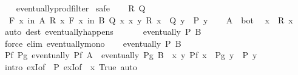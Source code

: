 \begin{isabellebody}
%
\isadelimproof
\ \ %
\endisadelimproof
%
\isatagproof
{}\isamarkupfalse%
\ eventually{\isacharunderscore}{\kern0pt}prod{\isacharunderscore}{\kern0pt}filter\isanewline
{}\isamarkupfalse%
\ safe\isanewline
\ \ \isamarkupfalse%
\ R\ Q\isanewline
\ \ \isamarkupfalse%
\ {\isacharasterisk}{\kern0pt}{\isacharcolon}{\kern0pt}\ {\isachardoublequoteopen}{\isasymforall}\isactrlsub F\ x\ in\ A{\isachardot}{\kern0pt}\ R\ x{\isachardoublequoteclose}\ {\isachardoublequoteopen}{\isasymforall}\isactrlsub F\ x\ in\ B{\isachardot}{\kern0pt}\ Q\ x{\isachardoublequoteclose}\ {\isachardoublequoteopen}{\isasymforall}x\ y{\isachardot}{\kern0pt}\ R\ x\ {\isasymlongrightarrow}\ Q\ y\ {\isasymlongrightarrow}\ P\ y{\isachardoublequoteclose}\isanewline
\ \ \isamarkupfalse%
\ {\isacartoucheopen}A\ {\isasymnoteq}\ bot{\isacartoucheclose}\ \isamarkupfalse%
\ x\ \ {\isachardoublequoteopen}R\ x{\isachardoublequoteclose}\ \isamarkupfalse%
\ {\isacharparenleft}{\kern0pt}auto\ dest{\isacharcolon}{\kern0pt}\ eventually{\isacharunderscore}{\kern0pt}happens{\isacharparenright}{\kern0pt}\isanewline
\ \ \isamarkupfalse%
\ {\isacharasterisk}{\kern0pt}\ \isamarkupfalse%
\ {\isachardoublequoteopen}eventually\ P\ B{\isachardoublequoteclose}\isanewline
\ \ \ \ \isamarkupfalse%
\ {\isacharparenleft}{\kern0pt}force\ elim{\isacharcolon}{\kern0pt}\ eventually{\isacharunderscore}{\kern0pt}mono{\isacharparenright}{\kern0pt}\isanewline
{}\isamarkupfalse%
\isanewline
\ \ \isamarkupfalse%
\ {\isachardoublequoteopen}eventually\ P\ B{\isachardoublequoteclose}\isanewline
\ \ \isamarkupfalse%
\ \isamarkupfalse%
\ {\isachardoublequoteopen}{\isasymexists}Pf\ Pg{\isachardot}{\kern0pt}\ eventually\ Pf\ A\ {\isasymand}\ eventually\ Pg\ B\ {\isasymand}\ {\isacharparenleft}{\kern0pt}{\isasymforall}x\ y{\isachardot}{\kern0pt}\ Pf\ x\ {\isasymlongrightarrow}\ Pg\ y\ {\isasymlongrightarrow}\ P\ y{\isacharparenright}{\kern0pt}{\isachardoublequoteclose}\isanewline
\ \ \ \ \isamarkupfalse%
\ {\isacharparenleft}{\kern0pt}intro\ exI{\isacharbrackleft}{\kern0pt}of\ {\isacharunderscore}{\kern0pt}\ P{\isacharbrackright}{\kern0pt}\ exI{\isacharbrackleft}{\kern0pt}of\ {\isacharunderscore}{\kern0pt}\ {\isachardoublequoteopen}{\isasymlambda}x{\isachardot}{\kern0pt}\ True{\isachardoublequoteclose}{\isacharbrackright}{\kern0pt}{\isacharparenright}{\kern0pt}\ auto\isanewline

\end{isabellebody}
